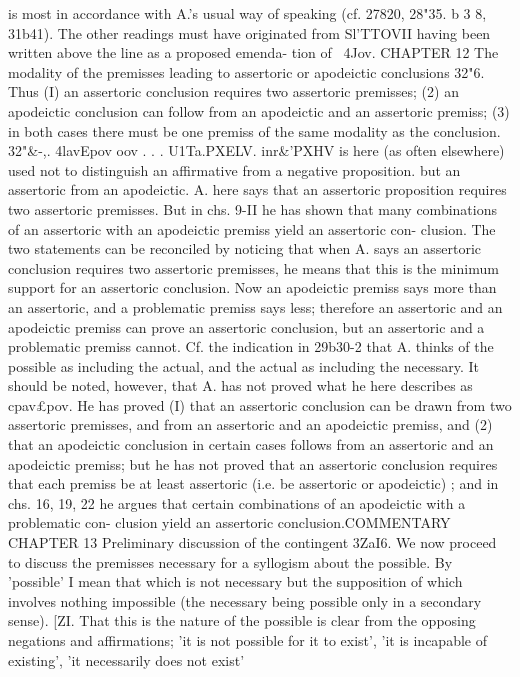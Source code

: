 {{{{is most in accordance with A.'s usual way of speaking (cf. 27820,
28"35. b 3 8, 31b41). The other readings must have originated from
Sl'TTOVII having been written above the line as a proposed emenda-
tion of ~4Jov.
CHAPTER 12
The modality of the premisses leading to assertoric or apodeictic
conclusions
32"6. Thus (I) an assertoric conclusion requires two assertoric
premisses; (2) an apodeictic conclusion can follow from an
apodeictic and an assertoric premiss; (3) in both cases there must
be one premiss of the same modality as the conclusion.
32"&-,. 4lavEpov oov . . . U1Ta.PXELV. inr&'PXHV is here (as often
elsewhere) used not to distinguish an affirmative from a negative
proposition. but an assertoric from an apodeictic. A. here says
that an assertoric proposition requires two assertoric premisses.
But in chs. 9-II he has shown that many combinations of an
assertoric with an apodeictic premiss yield an assertoric con-
clusion. The two statements can be reconciled by noticing that
when A. says an assertoric conclusion requires two assertoric
premisses, he means that this is the minimum support for an
assertoric conclusion. Now an apodeictic premiss says more than
an assertoric, and a problematic premiss says less; therefore an
assertoric and an apodeictic premiss can prove an assertoric
conclusion, but an assertoric and a problematic premiss cannot.
Cf. the indication in 29b30-2 that A. thinks of the possible as
including the actual, and the actual as including the necessary.
It should be noted, however, that A. has not proved what he
here describes as cpav£pov. He has proved (I) that an assertoric
conclusion can be drawn from two assertoric premisses, and from
an assertoric and an apodeictic premiss, and (2) that an apodeictic
conclusion in certain cases follows from an assertoric and an
apodeictic premiss; but he has not proved that an assertoric
conclusion requires that each premiss be at least assertoric (i.e.
be assertoric or apodeictic) ; and in chs. 16, 19, 22 he argues that
certain combinations of an apodeictic with a problematic con-
clusion yield an assertoric conclusion.COMMENTARY
CHAPTER 13
Preliminary discussion of the contingent
3ZaI6. We now proceed to discuss the premisses necessary for
a syllogism about the possible. By 'possible' I mean that which
is not necessary but the supposition of which involves nothing
impossible (the necessary being possible only in a secondary
sense).
[ZI. That this is the nature of the possible is clear from the
opposing negations and affirmations; 'it is not possible for it to
exist', 'it is incapable of existing', 'it necessarily does not exist'
}}}}
